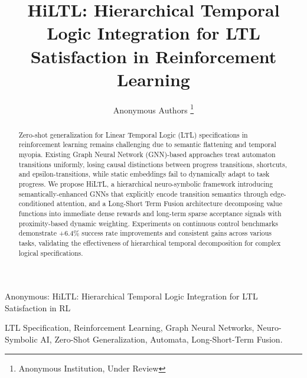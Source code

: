 \documentclass[journal]{IEEEtran}
\begin{document}
\title{HiLTL: Hierarchical Temporal Logic Integration for LTL Satisfaction in Reinforcement Learning}


\author{Anonymous Authors%
\thanks{Anonymous Institution, Under Review}}

%
{Anonymous: HiLTL: Hierarchical Temporal Logic Integration for LTL Satisfaction in RL}

\maketitle

\begin{abstract}
Zero-shot generalization for Linear Temporal Logic (LTL) specifications in reinforcement learning remains challenging due to semantic flattening and temporal myopia. Existing Graph Neural Network (GNN)-based approaches treat automaton transitions uniformly, losing causal distinctions between progress transitions, shortcuts, and epsilon-transitions, while static embeddings fail to dynamically adapt to task progress. We propose HiLTL, a hierarchical neuro-symbolic framework introducing semantically-enhanced GNNs that explicitly encode transition semantics through edge-conditioned attention, and a Long-Short Term Fusion architecture decomposing value functions into immediate dense rewards and long-term sparse acceptance signals with proximity-based dynamic weighting. Experiments on continuous control benchmarks demonstrate +6.4\% success rate improvements and consistent gains across various tasks, validating the effectiveness of hierarchical temporal decomposition for complex logical specifications.
\end{abstract}

\begin{IEEEkeywords}
LTL Specification, Reinforcement Learning, Graph Neural Networks, Neuro-Symbolic AI, Zero-Shot Generalization, Automata, Long-Short-Term Fusion.
\end{IEEEkeywords}






%
\IEEEpeerreviewmaketitle
\end{document}
